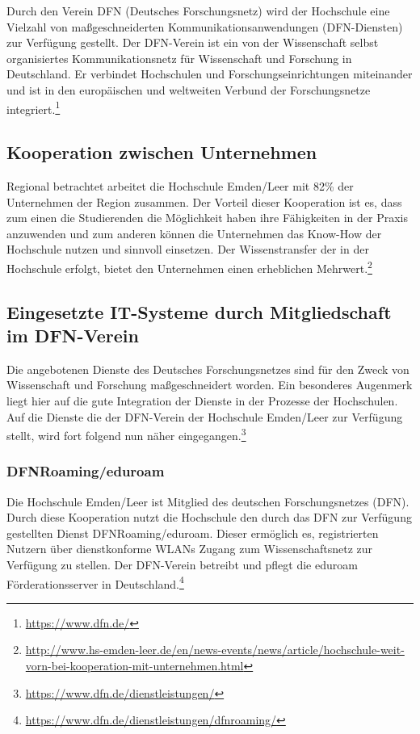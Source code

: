Durch den Verein DFN (Deutsches Forschungsnetz) wird der Hochschule eine Vielzahl von maßgeschneiderten Kommunikationsanwendungen (DFN-Diensten) zur Verfügung gestellt. Der DFN-Verein ist ein von der Wissenschaft selbst organisiertes Kommunikationsnetz für Wissenschaft und Forschung in Deutschland. Er verbindet Hochschulen und Forschungseinrichtungen miteinander und ist in den europäischen und weltweiten  Verbund der Forschungsnetze integriert.\footnote{\url{https://www.dfn.de/}}

\subsection{Kooperation zwischen Unternehmen}
Regional betrachtet arbeitet die Hochschule Emden/Leer mit 82\% der Unternehmen der Region zusammen. Der Vorteil dieser Kooperation ist es, dass zum einen die Studierenden die Möglichkeit haben ihre Fähigkeiten in der Praxis anzuwenden und zum anderen können die Unternehmen das Know-How  der Hochschule nutzen und sinnvoll einsetzen. Der Wissenstransfer der in der Hochschule erfolgt, bietet den Unternehmen einen erheblichen Mehrwert.\footnote{\url{http://www.hs-emden-leer.de/en/news-events/news/article/hochschule-weit-vorn-bei-kooperation-mit-unternehmen.html}}

\subsection{Eingesetzte IT-Systeme durch Mitgliedschaft im DFN-Verein}
Die angebotenen Dienste des Deutsches Forschungsnetzes sind für den Zweck von Wissenschaft und Forschung maßgeschneidert worden. Ein besonderes Augenmerk liegt hier auf die gute Integration der Dienste in der Prozesse der Hochschulen.  Auf die Dienste die der DFN-Verein der Hochschule Emden/Leer zur Verfügung stellt, wird fort folgend nun näher eingegangen.\footnote{\url{https://www.dfn.de/dienstleistungen/}}

\subsubsection{DFNRoaming/eduroam}
Die Hochschule Emden/Leer ist Mitglied des deutschen Forschungsnetzes (DFN). Durch diese Kooperation nutzt die Hochschule den durch das DFN zur Verfügung gestellten Dienst DFNRoaming/eduroam. Dieser ermöglich es, registrierten Nutzern über dienstkonforme WLANs Zugang zum Wissenschaftsnetz zur Verfügung zu stellen.  Der DFN-Verein betreibt und pflegt die eduroam Förderationsserver in Deutschland.\footnote{\url{https://www.dfn.de/dienstleistungen/dfnroaming/}}

